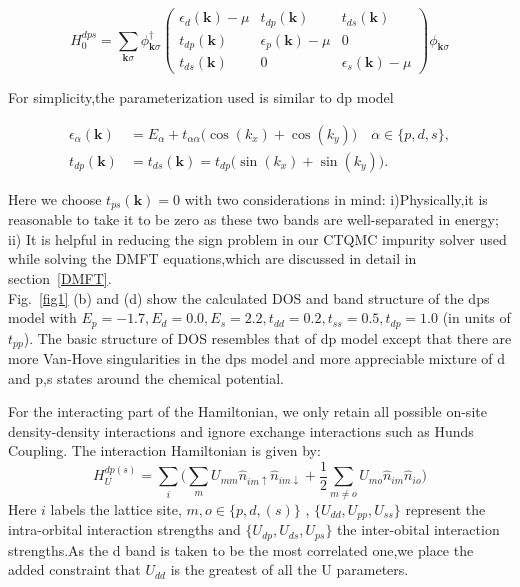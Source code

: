\documentclass[10pt]{ruthesis}
\begin{document}
{ \begin{equation}
 H^{dps}_0=\sum_{\mathbf k \sigma}\phi^\dagger_{\mathbf k\sigma}
 \left(
 \begin{array}{ccc}
 \epsilon_d(\mathbf k)-\mu&t_{dp}(\mathbf k)&t_{ds}(\mathbf k)\\
t_{dp}(\mathbf k)&\epsilon_p(\mathbf k)-\mu&0\\
t_{ds}(\mathbf k)&0&\epsilon_s(\mathbf k)-\mu
 \end{array}
 \right)
 \phi_{\mathbf k\sigma}
 \end{equation}

 For simplicity,the parameterization used  is similar to dp model 

 \begin{align*}
 \epsilon_{\alpha}(\mathbf k) &=E_\alpha+t_{\alpha\alpha}\big(\cos(k_x)+\cos(k_y)\big)\quad \alpha\in\{p,d,s\},\\
 t_{dp}(\mathbf k) &=t_{ds}(\mathbf k)=t_{dp}\big(\sin(k_x)+\sin(k_y)\big).
 \end{align*}

 Here we choose $t_{ps}(\mathbf k)=0$ with two considerations in mind: i)Physically,it is reasonable to take it to be zero as these two bands are well-separated in energy; ii) It is helpful in reducing the sign problem in our CTQMC impurity solver used while solving the DMFT equations,which are discussed in detail in section~\ref{DMFT}.\\
 Fig.~\ref{fig1} (b) and (d) show the calculated DOS and band structure of the dps model with $E_p=-1.7,E_d=0.0,E_s=2.2,t_{dd}=0.2,t_{ss}=0.5,t_{dp}=1.0$ (in units of $t_{pp}$). The basic structure of DOS resembles that of dp model except that there are more Van-Hove singularities in the dps model and more appreciable mixture of d and p,s states around the chemical potential.


For the interacting part of the Hamiltonian, we only retain all possible on-site density-density interactions and ignore exchange interactions such as Hunds Coupling. The interaction Hamiltonian is given by:
 \begin{equation}\label{int}
 H^{dp(s)}_U=\sum_{i}\bigg(\sum_{m}U_{mm}\hat{n}_{im\uparrow}\hat{n}_{im\downarrow}+\frac{1}{2}\sum_{m\neq o}U_{mo}\hat{n}_{im}\hat{n}_{io}\bigg)
 \end{equation}
 Here $i$ labels the lattice site, $m,o\in\{p,d,(s)\}$ , $\{U_{dd},U_{pp},U_{ss}\}$ represent the intra-orbital interaction strengths and  $\{U_{dp},U_{ds},U_{ps}\}$ the inter-obital interaction strengths.As the d band is taken to be the most correlated one,we place the added constraint that $U_{dd}$ is the greatest of all the U parameters.
 
}
\end{document}
